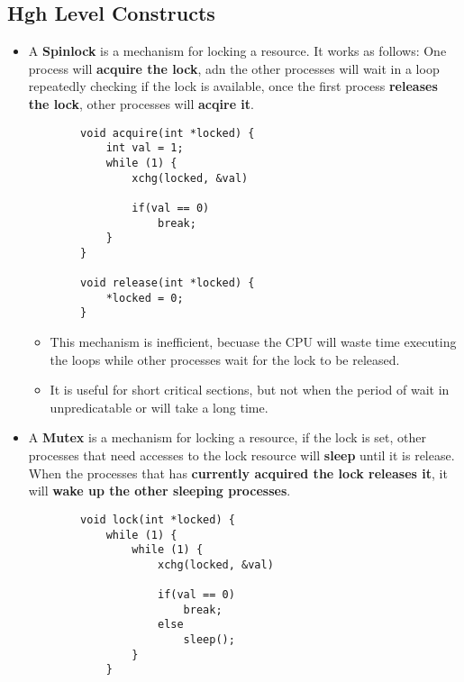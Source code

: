 \documentclass{article}
\begin{document}
\subsection*{Hgh Level Constructs}
\begin{itemize}
    \item A \textbf{Spinlock} is a mechanism for locking a resource. It works as follows: One process will \textbf{acquire the lock}, adn the other processes will wait in a loop repeatedly checking if the lock is available, once the first process \textbf{releases the lock}, other processes will \textbf{acqire it}.
    \begin{verbatim}
        void acquire(int *locked) {
            int val = 1;
            while (1) {
                xchg(locked, &val)

                if(val == 0)
                    break;
            }
        }

        void release(int *locked) {
            *locked = 0;
        }
    \end{verbatim}
    \begin{itemize}
        \item This mechanism is inefficient, becuase the CPU will waste time executing the loops while other processes wait for the lock to be released.
        \item It is useful for short critical sections, but not when the period of wait in unpredicatable or will take a long time.
    \end{itemize}
    \item A \textbf{Mutex} is a mechanism for locking a resource, if the lock is set, other processes that need accesses to the lock resource will \textbf{sleep} until it is release. When the processes that has \textbf{currently acquired the lock releases it}, it will \textbf{wake up the other sleeping processes}.
    \begin{verbatim}
        void lock(int *locked) {
            while (1) {
                while (1) {
                    xchg(locked, &val)
    
                    if(val == 0)
                        break;
                    else
                        sleep();
                }
            }


\end{verbatim}
\end{itemize}
\end{document}
